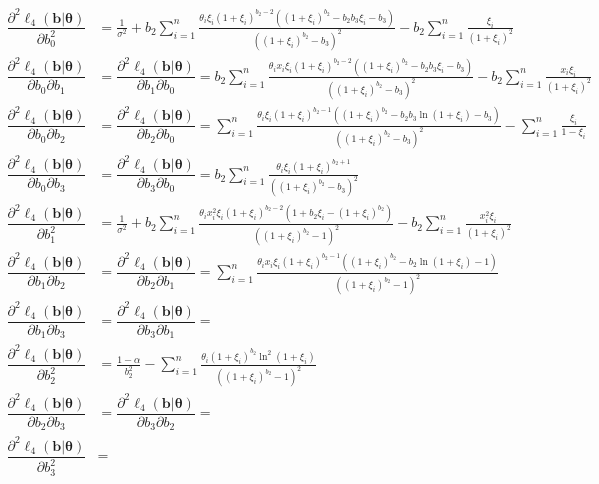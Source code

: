 \documentclass[11pt, letterpaper]{article}
\begin{document}
\begin{align*}
\dfrac{\partial^2 \ell_4(\bm b | \bm \theta)}{\partial b_0 ^2} &=  \frac{1}{\sigma^2} + b_2 \sum_{i=1}^n \frac{\theta_i \xi_i (1+\xi_i)^{b_2-2}((1+\xi_i)^{b_2} - b_2 b_3 \xi_i - b_3)}{\left((1+\xi_i)^{b_2} - b_3 \right)^2} -b_2 \sum_{i=1}^n \frac{ \xi_i}{(1+\xi_i )^2}\\
\dfrac{\partial^2 \ell_4(\bm b | \bm \theta)}{\partial b_0 \partial b_1} &= \dfrac{\partial^2 \ell_4(\bm b | \bm \theta)}{\partial b_1 \partial b_0} =  b_2 \sum_{i=1}^n \frac{\theta_i x_i \xi_i (1+\xi_i)^{b_2-2}( (1+\xi_i)^{b_2}- b_2 b_3 \xi_i - b_3)}{\left((1+\xi_i)^{b_2}- b_3 \right)^2} -b_2 \sum_{i=1}^n \frac{x_i \xi_i}{(1+\xi_i )^2}\\
\dfrac{\partial^2 \ell_4(\bm b | \bm \theta)}{\partial b_0 \partial b_2} &= \dfrac{\partial^2 \ell_4(\bm b | \bm \theta)}{\partial b_2 \partial b_0} = \sum_{i=1}^n \frac{\theta_i\xi_i(1+\xi_i)^{b_2-1}\left((1+\xi_i)^{b_2}- b_2 b_3 \ln (1+\xi_i) -b_3 \right)}{\left((1+\xi_i)^{b_2} - b_3 \right)^2} -\sum_{i=1}^n \frac{\xi_i}{1-\xi_i} \\
\dfrac{\partial^2 \ell_4(\bm b | \bm \theta)}{\partial b_0 \partial b_3} &= \dfrac{\partial^2 \ell_4(\bm b | \bm \theta)}{\partial b_3 \partial b_0} = b_2 \sum_{i=1}^n \frac{\theta_i \xi_i(1+\xi_i)^{b_2+1}}{\left((1+\xi_i)^{b_2}- b_3 \right)^2}  \\
\dfrac{\partial^2 \ell_4(\bm b | \bm \theta)}{\partial b_1 ^2} &= \frac{1}{\sigma^2} + b_2 \sum_{i=1}^n \frac{\theta_i x_i^2\xi_i (1+\xi_i)^{b_2-2}(1+b_2 \xi_i - (1+\xi_i)^{b_2})}{\left((1+\xi_i)^{b_2} - 1 \right)^2} -b_2 \sum_{i=1}^n \frac{x_i^2 \xi_i}{(1+\xi_i )^2}\\
\dfrac{\partial^2 \ell_4(\bm b | \bm \theta)}{\partial b_1 \partial b_2} &= \dfrac{\partial^2 \ell_4(\bm b | \bm \theta)}{\partial b_2 \partial b_1} =  \sum_{i=1}^n \frac{\theta_i x_i\xi_i(1+\xi_i)^{b_2-1}\left((1+\xi_i)^{b_2}- b_2 \ln (1+\xi_i) -1 \right)}{\left((1+\xi_i)^{b_2} - 1 \right)^2} \\
\dfrac{\partial^2 \ell_4(\bm b | \bm \theta)}{\partial b_1 \partial b_3} &= \dfrac{\partial^2 \ell_4(\bm b | \bm \theta)}{\partial b_3 \partial b_1} = \\
\dfrac{\partial^2 \ell_4(\bm b | \bm \theta)}{\partial b_2 ^2} &= \frac{1-\alpha}{b_2^2} - \sum_{i=1}^n \frac{\theta_i(1+\xi_i)^{b_2}\ln ^2(1+\xi_i)}{\left((1+\xi_i)^{b_2} - 1 \right)^2} \\
\dfrac{\partial^2 \ell_4(\bm b | \bm \theta)}{\partial b_2 \partial b_3} &= \dfrac{\partial^2 \ell_4(\bm b | \bm \theta)}{\partial b_3 \partial b_2} = \\
\dfrac{\partial^2 \ell_4(\bm b | \bm \theta)}{ \partial b_3^2} &= \\
\end{align*}
\end{document}

